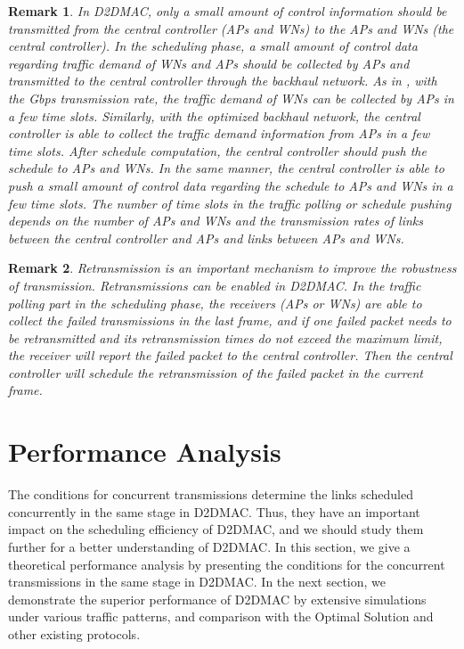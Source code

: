 \documentclass[journal]{IEEEtran}
\newtheorem{remark}{Remark}
\begin{document}
\begin{remark}

In D2DMAC, only a small amount of control information should be transmitted from the central controller (APs and WNs) to the APs and WNs (the central controller). In the scheduling phase, a small amount of control data regarding traffic demand of WNs and APs should be collected by APs and transmitted to the central controller through the backhaul network. As in \cite{mao}, with the Gbps transmission rate, the traffic demand of WNs can be collected by APs in a few time slots. Similarly, with the optimized backhaul network, the central controller is able to collect the traffic demand information from APs in a few time slots. After schedule computation, the central controller should push the schedule to APs and WNs. In the same manner, the central controller is able to push a small amount of control data regarding the schedule to APs and WNs in a few time slots. The number of time slots in the traffic polling or schedule pushing depends on the number of APs and WNs and the transmission rates of links between the central controller and APs and links between APs and WNs.




\end{remark}

\begin{remark}
Retransmission is an important mechanism to improve the robustness of transmission. Retransmissions can be enabled in D2DMAC. In the traffic polling part in the scheduling phase, the receivers (APs or WNs) are able to collect the failed transmissions in the last frame, and if one failed packet needs to be retransmitted and its retransmission times do not exceed the maximum limit, the receiver will report the failed packet to the central controller. Then the central controller will schedule the retransmission of the failed packet in the current frame.



\end{remark}


\section{Performance Analysis}\label{S5-i}

The conditions for concurrent transmissions determine the links scheduled concurrently in the same stage in D2DMAC. Thus, they have an important impact on the scheduling efficiency of D2DMAC, and we should study them further for a
better understanding of D2DMAC. In this section, we give a theoretical performance analysis by
presenting the conditions for the concurrent transmissions in the same stage in D2DMAC. In the next section, we demonstrate the superior performance of D2DMAC by extensive simulations under various traffic patterns, and comparison with the Optimal Solution and other existing protocols.
\end{document}
